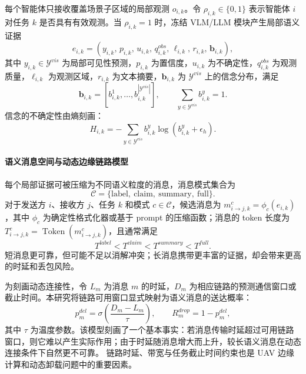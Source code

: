 每个智能体只接收覆盖场景子区域的局部观测 $o_{i,k}$。令 $\rho_{i,k}\in\{0,1\}$ 表示智能体 $i$ 对任务 $k$ 是否具有有效观测。当 $\rho_{i,k}=1$ 时，冻结 VLM/LLM 模块产生局部语义证据
\begin{equation}
e_{i,k}=\left(y_{i,k},\,p_{i,k},\,u_{i,k},\,q_{i,k}^{obs},\,\ell_{i,k},\,r_{i,k},\,\mathbf{b}_{i,k}\right),
\end{equation}
其中 $y_{i,k}\in\mathcal{Y}^{vis}$ 为局部可见性预测，$p_{i,k}$ 为置信度，$u_{i,k}$ 为不确定性，$q_{i,k}^{obs}$ 为观测质量，$\ell_{i,k}$ 为观测区域，$r_{i,k}$ 为文本摘要，$\mathbf{b}_{i,k}$ 为 $\mathcal{Y}^{vis}$ 上的信念分布，满足
\begin{equation}
\mathbf{b}_{i,k}=\left[b_{i,k}^{1},\ldots,b_{i,k}^{|\mathcal{Y}^{vis}|}\right],\qquad
\sum_{y\in\mathcal{Y}^{vis}}b_{i,k}^{y}=1.
\end{equation}
信念的不确定性由熵刻画：
\begin{equation}
H_{i,k}=-\sum_{y\in\mathcal{Y}^{vis}}b_{i,k}^{y}\log\!\left(b_{i,k}^{y}+\epsilon_h\right).
\end{equation}
\paragraph{语义消息空间与动态边缘链路模型}
每个局部证据可被压缩为不同语义粒度的消息，消息模式集合为
\begin{equation}
\mathcal{C}=\{\text{label},\ \text{claim},\ \text{summary},\ \text{full}\}.
\end{equation}
对于发送方 $i$、接收方 $j$、任务 $k$ 和模式 $c\in\mathcal{C}$，候选消息为 $m_{i\rightarrow j,k}^{c}=\phi_c(e_{i,k})$，其中 $\phi_c$ 为确定性格式化器或基于 prompt 的压缩函数；消息的 token 长度为 $T_{i\rightarrow j,k}^{c}=\operatorname{Token}(m_{i\rightarrow j,k}^{c})$，且通常满足
\begin{equation}
T^{label}<T^{claim}<T^{summary}<T^{full}.
\end{equation}
短消息更可靠，但可能不足以消解冲突；长消息携带更丰富的证据，却会带来更高的时延和丢包风险。

为刻画动态连接性，令 $L_m$ 为消息 $m$ 的时延，$D_m$ 为相应链路的预测通信窗口或截止时间。本研究将链路可用窗口显式映射为语义消息的送达概率：
\begin{equation}
p_m^{del}=\sigma\!\left(\frac{D_m-L_m}{\tau}\right),\qquad R_m^{drop}=1-p_m^{del},
\end{equation}
其中 $\tau$ 为温度参数。该模型刻画了一个基本事实：若消息传输时延超过可用链路窗口，则它难以产生实际作用；由于时延随消息增大而上升，较长语义消息在动态连接条件下自然更不可靠。
链路时延、带宽与任务截止时间约束也是 UAV 边缘计算和动态卸载问题中的重要因素。
